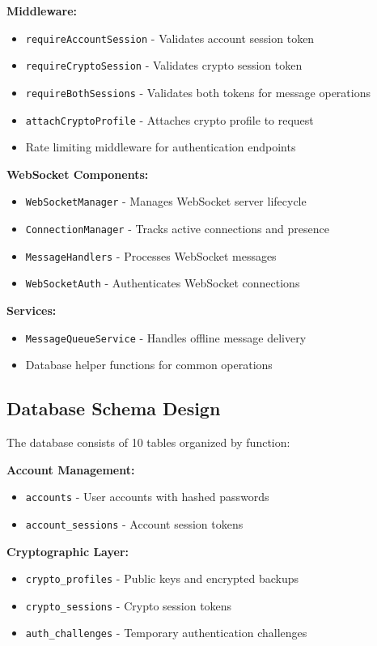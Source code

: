 \textbf{Middleware:}
\begin{itemize}
    \item \texttt{requireAccountSession} - Validates account session token
    \item \texttt{requireCryptoSession} - Validates crypto session token
    \item \texttt{requireBothSessions} - Validates both tokens for message operations
    \item \texttt{attachCryptoProfile} - Attaches crypto profile to request
    \item Rate limiting middleware for authentication endpoints
\end{itemize}

\textbf{WebSocket Components:}
\begin{itemize}
    \item \texttt{WebSocketManager} - Manages WebSocket server lifecycle
    \item \texttt{ConnectionManager} - Tracks active connections and presence
    \item \texttt{MessageHandlers} - Processes WebSocket messages
    \item \texttt{WebSocketAuth} - Authenticates WebSocket connections
\end{itemize}

\textbf{Services:}
\begin{itemize}
    \item \texttt{MessageQueueService} - Handles offline message delivery
    \item Database helper functions for common operations
\end{itemize}

\subsection{Database Schema Design}

The database consists of 10 tables organized by function:

\textbf{Account Management:}
\begin{itemize}
    \item \texttt{accounts} - User accounts with hashed passwords
    \item \texttt{account\_sessions} - Account session tokens
\end{itemize}

\textbf{Cryptographic Layer:}
\begin{itemize}
    \item \texttt{crypto\_profiles} - Public keys and encrypted backups
    \item \texttt{crypto\_sessions} - Crypto session tokens
    \item \texttt{auth\_challenges} - Temporary authentication challenges
\end{itemize}

